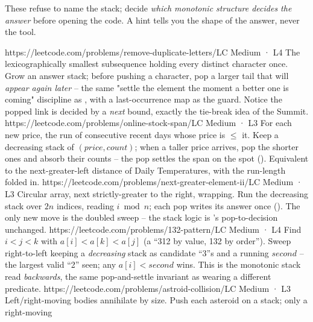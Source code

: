 
These refuse to name the stack; decide \emph{which monotonic structure decides the answer} before opening
the code. A hint tells you the shape of the answer, never the tool.

\begin{mixedset}
    {https://leetcode.com/problems/remove-duplicate-letters/}{LC Medium · L4}
    {The lexicographically smallest subsequence holding every distinct character once. Grow an answer
    stack; before pushing a character, pop a larger tail that will \emph{appear again later} -- the same
    "settle the element the moment a better one is coming" discipline as , with a
    last-occurrence map as the guard. Notice the popped link is decided by a \emph{next} bound, exactly the
    tie-break idea of the Summit.}
    {https://leetcode.com/problems/online-stock-span/}{LC Medium · L3}
    {For each new price, the run of consecutive recent days whose price is $\le$ it. Keep a decreasing
    stack of $(\mathit{price},\mathit{count})$; when a taller price arrives, pop the shorter ones and
    absorb their counts -- the pop settles the span on the spot (). Equivalent to the
    next-greater-left distance of Daily Temperatures, with the run-length folded in.}
    {https://leetcode.com/problems/next-greater-element-ii/}{LC Medium · L3}
    {Circular array, next strictly-greater to the right, wrapping. Run the decreasing stack over $2n$
    indices, reading $i \bmod n$; each pop writes its answer once (). The only new
    move is the doubled sweep -- the stack logic is 's pop-to-decision unchanged.}
    {https://leetcode.com/problems/132-pattern/}{LC Medium · L4}
    {Find $i<j<k$ with $a[i]<a[k]<a[j]$ (a ``312 by value, 132 by order''). Sweep right-to-left keeping a
    \emph{decreasing} stack as candidate ``3''s and a running $\mathit{second}$ -- the largest valid ``2''
    seen; any $a[i]<\mathit{second}$ wins. This is the monotonic stack read \emph{backwards}, the same
    pop-and-settle invariant as  wearing a different predicate.}
    {https://leetcode.com/problems/astroid-collision/}{LC Medium · L3}
    {Left/right-moving bodies annihilate by size. Push each asteroid on a stack; only a right-moving
}
\end{mixedset}
